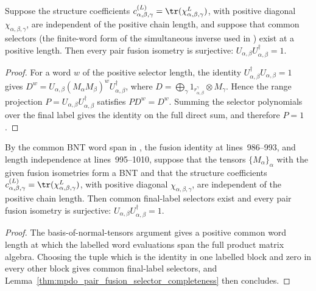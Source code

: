 \begin{lemma}%
    \label{thm:mpdo_pair_fusion_selector_completeness}
    \leanok
    Suppose the structure coefficients
    $c^{(L)}_{\alpha,\beta,\gamma}
        =\tr(\chi_{\alpha,\beta,\gamma}^{L})$, with positive diagonal
    $\chi_{\alpha,\beta,\gamma}$, are independent of the positive chain
    length, and suppose that common selectors (the finite-word form of the
    simultaneous inverse used in \cite[line~269]{Bultinck2017Anyons}) exist at
    a positive length. Then every pair fusion isometry is surjective:
    $U_{\alpha,\beta}U_{\alpha,\beta}^{\dagger}=1$.
\end{lemma}
\begin{proof}\leanok
    For a word $w$ of the positive selector length, the identity
    $U_{\alpha,\beta}^{\dagger}U_{\alpha,\beta}=1$ gives
    $D^w=U_{\alpha,\beta}(M_\alpha M_\beta)^w
        U_{\alpha,\beta}^{\dagger}$, where
    $D=\bigoplus_\gamma
        1_{r_{\alpha,\beta}^{\gamma}}\otimes M_\gamma$.
    Hence the range projection
    $P=U_{\alpha,\beta}U_{\alpha,\beta}^{\dagger}$ satisfies $PD^w=D^w$.
    Summing the selector polynomials over the final label gives the identity
    on the full direct sum, and therefore $P=1$.
\end{proof}

\begin{lemma}%
    \label{thm:mpdo_pair_fusion_bnt_completeness}
    \leanok
    By the common BNT word span in \cite[lines~317--345]{Cirac2016MPDO_arXiv},
    the fusion identity at lines~986--993, and length independence at
    lines~995--1010, suppose that the tensors $\{M_\alpha\}_\alpha$ with the
    given fusion isometries form a BNT and that the structure coefficients
    $c^{(L)}_{\alpha,\beta,\gamma}
        =\tr(\chi_{\alpha,\beta,\gamma}^{L})$, with positive diagonal
    $\chi_{\alpha,\beta,\gamma}$, are independent of the positive chain
    length. Then common final-label selectors exist and every pair fusion
    isometry is surjective:
    $U_{\alpha,\beta}U_{\alpha,\beta}^{\dagger}=1$.
\end{lemma}
\begin{proof}\leanok
    The basis-of-normal-tensors argument gives a positive common word length
    at which the labelled word evaluations span the full product matrix
    algebra. Choosing the tuple which is the identity in one labelled block
    and zero in every other block gives common final-label selectors, and
    Lemma~\ref{thm:mpdo_pair_fusion_selector_completeness} then concludes.
\end{proof}
